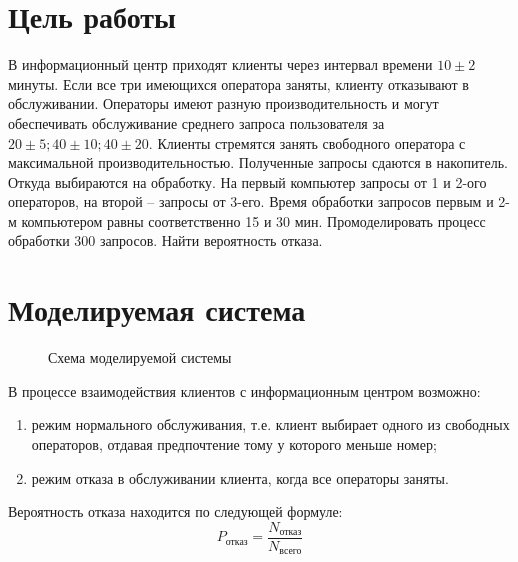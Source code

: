 \section*{Цель работы}

В информационный центр приходят клиенты через интервал времени $10 \pm 2$
минуты. Если все три имеющихся оператора заняты, клиенту отказывают в
обслуживании. Операторы имеют разную производительность и могут обеспечивать
обслуживание среднего запроса пользователя за $20 \pm 5; 40 \pm 10; 40 \pm 20.$
Клиенты стремятся занять свободного оператора с максимальной
производительностью. Полученные запросы сдаются в накопитель. Откуда выбираются
на обработку. На первый компьютер запросы от 1 и 2-ого операторов, на второй --
запросы от 3-его. Время обработки запросов первым и 2-м компьютером равны
соответственно 15 и 30 мин. Промоделировать процесс обработки 300 запросов.
Найти вероятность отказа. 

\section*{Моделируемая система}

\begin{figure}[h]
    \centering
    \def\svgwidth{\textwidth}
    
    \caption{Схема моделируемой системы}
\end{figure}

В процессе взаимодействия клиентов с информационным центром возможно:
\begin{enumerate}
    \item режим нормального обслуживания, т.е. клиент выбирает одного из
          свободных операторов, отдавая предпочтение тому у которого меньше
          номер;
    \item режим отказа в обслуживании клиента, когда все операторы заняты.
\end{enumerate}

Вероятность отказа находится по следующей формуле:
\begin{equation*}
    P_\text{отказ} = \frac{N_\text{отказ}}{N_\text{всего}}
\end{equation*}

